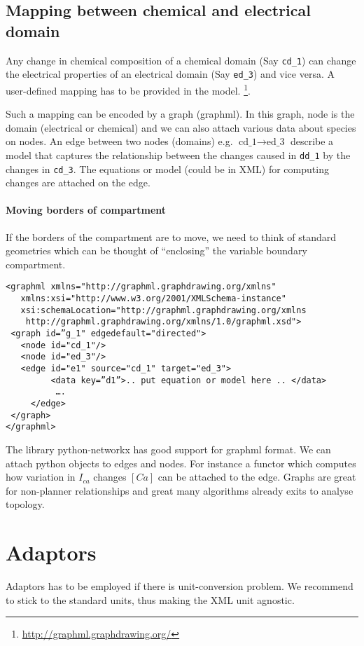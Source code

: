 \subsection{Mapping between chemical and electrical domain}

Any change in chemical composition of a chemical domain (Say \texttt{cd\_1}) can
change the electrical properties of an electrical domain (Say \texttt{ed\_3})
and vice versa. A user-defined mapping has to be provided in the model.
\footnote{\url{http://graphml.graphdrawing.org/}}.


Such a mapping can be encoded by a graph (graphml). In this graph, node is the
domain (electrical or chemical) and we can also attach various data about
species on nodes. An edge between two nodes (domains) e.g.  $\text{cd\_1}
\rightarrow \text{ed\_3}$ describe a model that captures the relationship
between the changes caused in \texttt{dd\_1} by the changes in \texttt{cd\_3}.
The equations or model (could be in XML) for computing changes are attached on
the edge. 

\paragraph{Moving borders of compartment}

    If the borders of the compartment are to move, we need to think of standard
    geometries which can be thought of ``enclosing'' the variable boundary
    compartment.


\begin{verbatim}
<graphml xmlns="http://graphml.graphdrawing.org/xmlns"  
   xmlns:xsi="http://www.w3.org/2001/XMLSchema-instance"
   xsi:schemaLocation="http://graphml.graphdrawing.org/xmlns
    http://graphml.graphdrawing.org/xmlns/1.0/graphml.xsd">
 <graph id=”g_1" edgedefault="directed">
   <node id="cd_1"/>
   <node id="ed_3"/>
   <edge id="e1" source="cd_1" target="ed_3">
         <data key=”d1”>.. put equation or model here .. </data>
          ….
     </edge>
 </graph>
</graphml>
\end{verbatim}

The library python-networkx has good support for graphml format. We can attach
python objects to edges and nodes. For instance a functor which computes how
variation in $I_{ca}$ changes $[Ca]$ can be attached to the edge. Graphs are
great for non-planner relationships and great many algorithms already exits to
analyse topology.


\section{Adaptors}

Adaptors has to be employed if there is unit-conversion problem. We recommend to
stick to the standard units, thus making the XML unit agnostic.





